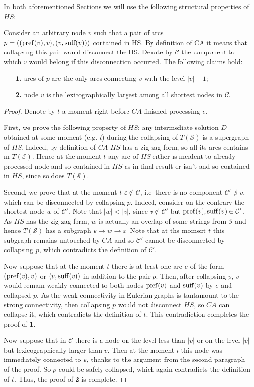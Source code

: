 In both aforementioned Sections we will use the following structural properties of $HS$:
\begin{lemma}\label{lemma:property}
    Consider an arbitrary node $v$ such that a pair of arcs $p = ((\operatorname{pref}(v), v), (v, \operatorname{suff}(v)))$ contained in HS. By definition of CA it means that collapsing this pair would disconnect the HS. Denote by $\mathcal{C}$ the component to which $v$ would belong if this disconnection occurred. The following claims hold:
    \begin{itemize}
        \item[\bf 1.] arcs of $p$ are the only arcs connecting $v$ with the level $|v|-1$;
        \item[\bf 2.] node $v$ is the lexicographically largest among all shortest nodes in $\mathcal{C}$.
    \end{itemize}    
\end{lemma}
\begin{proof}
    Denote by $t$ a moment right before $CA$ finished processing $v$.
    
    First, we prove the following property of $HS$: any intermediate solution $D$ obtained at some moment (e.g. $t$) during the collapsing of $T(\mathcal{S})$ is a supergraph of $HS$. Indeed, by definition of $CA$ $HS$ has a zig-zag form, so all its arcs contains in $T(\mathcal{S})$. Hence at the moment $t$ any arc of $HS$ either is incident to already processed node and so contained in $HS$ as in final result or isn't and so contained in $HS$, since so does $T(\mathcal{S})$.
    
    Second, we prove that at the moment $t$ $\varepsilon \notin \mathcal{C}$, i.e. there is no component $\mathcal{C}' \not\ni v$, which can be disconnected by collapsing $p$. Indeed, consider on the contrary the shortest node $w$ of $\mathcal{C}'$. Note that $|w| < |v|$, since $v \notin \mathcal{C}'$ but $\operatorname{pref}(v), \operatorname{suff}(v) \in \mathcal{C}'$. As $HS$ has the zig-zag form, $w$ is actually an overlap of some strings from $\mathcal{S}$ and hence $T(\mathcal{S})$ has a subgraph $\varepsilon \to w \to \varepsilon$. Note that at the moment $t$ this subgraph remains untouched by $CA$ and so $\mathcal{C}'$ cannot be disconnected by collapsing $p$, which contradicts the definition of $\mathcal{C}'$.
    
    Now suppose that at the moment $t$ there is at least one arc $e$ of the form $(\operatorname{pref}(v), v)$ or $(v, \operatorname{suff}(v))$ in addition to the pair $p$. Then, after collapsing $p$, $v$ would remain weakly connected to both nodes $\operatorname{pref}(v)$ and $\operatorname{suff}(v)$ by $e$ and collapsed $p$. As the weak connectivity in Eulerian graphs is tantamount to the strong connectivity, then collapsing $p$ would not disconnect $HS$, so $CA$ can collapse it, which contradicts the definition of $t$. This contradiction completes the proof of {\bf 1}.
    
    Now suppose that in $\mathcal{C}$ there is a node on the level less than $|v|$ or on the level $|v|$ but lexicographically larger than $v$. Then at the moment $t$ this node was immediately connected to $\varepsilon$, thanks to the argument from the second paragraph of the proof. So $p$ could be safely collapsed, which again contradicts the definition of $t$. Thus, the proof of {\bf 2} is complete.
\end{proof}
